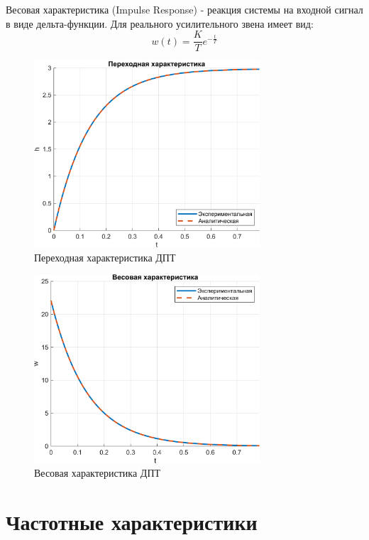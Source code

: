 Весовая характеристика (Impulse Response) - реакция системы на входной сигнал в виде дельта-функции.
Для реального усилительного звена имеет вид:
\[
w(t) = \frac{K}{T} e^{-\frac{t}{T}}
\]

\begin{figure}[H]
    \centering
    \includegraphics[width=0.75\textwidth, trim={0cm 0cm 0cm 0cm}]{../images/1_1.png}
    \caption{Переходная характеристика ДПТ}
\end{figure}

\begin{figure}[H]
    \centering
    \includegraphics[width=0.75\textwidth, trim={0cm 0cm 0cm 0cm}]{../images/1_2.png}
    \caption{Весовая характеристика ДПТ}
\end{figure}

\section{Частотные характеристики}

